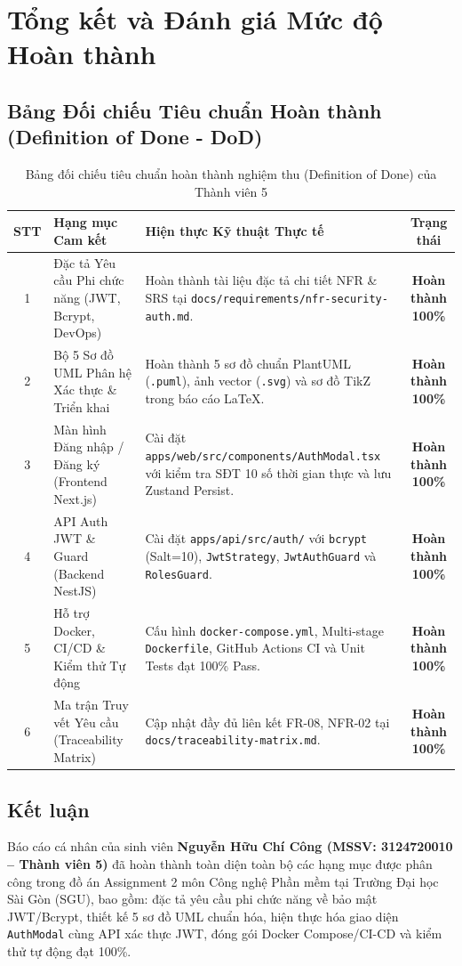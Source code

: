 \documentclass[a4paper]{article}
\begin{document}
\section{Tổng kết và Đánh giá Mức độ Hoàn thành}

\subsection{Bảng Đối chiếu Tiêu chuẩn Hoàn thành (Definition of Done - DoD)}
\begin{table}[H]
\centering
\small
\begin{tabularx}{\textwidth}{|c|p{4.2cm}|X|c|}
\hline
\textbf{STT} & \textbf{Hạng mục Cam kết} & \textbf{Hiện thực Kỹ thuật Thực tế} & \textbf{Trạng thái} \\ \hline
1 & Đặc tả Yêu cầu Phi chức năng (JWT, Bcrypt, DevOps) & Hoàn thành tài liệu đặc tả chi tiết NFR \& SRS tại \nolinkurl{docs/requirements/nfr-security-auth.md}. & \textbf{Hoàn thành 100\%} \\ \hline
2 & Bộ 5 Sơ đồ UML Phân hệ Xác thực \& Triển khai & Hoàn thành 5 sơ đồ chuẩn PlantUML (\texttt{.puml}), ảnh vector (\texttt{.svg}) và sơ đồ TikZ trong báo cáo LaTeX. & \textbf{Hoàn thành 100\%} \\ \hline
3 & Màn hình Đăng nhập / Đăng ký (Frontend Next.js) & Cài đặt \nolinkurl{apps/web/src/components/AuthModal.tsx} với kiểm tra SĐT 10 số thời gian thực và lưu Zustand Persist. & \textbf{Hoàn thành 100\%} \\ \hline
4 & API Auth JWT \& Guard (Backend NestJS) & Cài đặt \nolinkurl{apps/api/src/auth/} với \texttt{bcrypt} (Salt=10), \texttt{JwtStrategy}, \texttt{JwtAuthGuard} và \texttt{RolesGuard}. & \textbf{Hoàn thành 100\%} \\ \hline
5 & Hỗ trợ Docker, CI/CD \& Kiểm thử Tự động & Cấu hình \nolinkurl{docker-compose.yml}, Multi-stage \texttt{Dockerfile}, GitHub Actions CI và Unit Tests đạt 100\% Pass. & \textbf{Hoàn thành 100\%} \\ \hline
6 & Ma trận Truy vết Yêu cầu (Traceability Matrix) & Cập nhật đầy đủ liên kết FR-08, NFR-02 tại \nolinkurl{docs/traceability-matrix.md}. & \textbf{Hoàn thành 100\%} \\ \hline
\end{tabularx}
\caption{Bảng đối chiếu tiêu chuẩn hoàn thành nghiệm thu (Definition of Done) của Thành viên 5}
\label{tab:dod_evaluation}
\end{table}

\subsection{Kết luận}
Báo cáo cá nhân của sinh viên \textbf{Nguyễn Hữu Chí Công (MSSV: 3124720010 -- Thành viên 5)} đã hoàn thành toàn diện toàn bộ các hạng mục được phân công trong đồ án Assignment 2 môn Công nghệ Phần mềm tại Trường Đại học Sài Gòn (SGU), bao gồm: đặc tả yêu cầu phi chức năng về bảo mật JWT/Bcrypt, thiết kế 5 sơ đồ UML chuẩn hóa, hiện thực hóa giao diện \texttt{AuthModal} cùng API xác thực JWT, đóng gói Docker Compose/CI-CD và kiểm thử tự động đạt 100\%.
\end{document}
